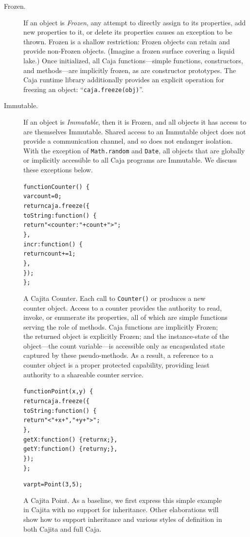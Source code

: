 \documentclass[letterpaper,twocolumn,10pt]{article}
\newcommand{\code}[1]{{\tt {#1}}}              %
\begin{document}
\begin{description}
  \item[Frozen.] If an object is \emph{Frozen}, any attempt to directly 
  assign to its properties, add new properties to it, or delete its 
  properties causes an exception to be thrown. Frozen is a shallow 
  restriction: Frozen objects can retain and provide non-Frozen objects. 
  (Imagine a frozen surface covering a liquid lake.) Once initialized, all 
  Caja functions---simple functions, constructors, and methods---are 
  implicitly frozen, as are constructor prototypes. The Caja runtime library 
  additionally provides an explicit operation for freezing an object: 
  ``\code{caja.freeze(obj)}''.
  
  \item[Immutable.] If an object is \emph{Immutable}, then it is Frozen, and 
  all objects it has access to are themselves Immutable. Shared access to an 
  Immutable object does not provide a communication channel, and so does not 
  endanger isolation. With the exception of \code{Math.random} and 
  \code{Date}, all objects that are globally or implicitly accessible to all 
  Caja programs are Immutable. We discuss these exceptions below.  

\end{description}

\begin{figure}
\begin{alltt}
function Counter()\ \{
  var count = 0;
  return caja.freeze(\{
    toString: function()\ \{ 
      return "<counter: " + count + ">"; 
    \},
    incr: function()\ \{ 
      return count += 1; 
    \},
  \});
\};
\end{alltt}

\caption[A Cajita Counter.]{A Cajita Counter. Each call to \code{Counter()} 
or produces a new counter object. Access to a counter provides the authority 
to read, invoke, or enumerate its properties, all of which are simple 
functions serving the role of methods. Caja functions are implicitly Frozen; 
the returned object is explicitly Frozen; and the instance-state of the 
object---the count variable---is accessible only as encapsulated state 
captured by these pseudo-methods. As a result, a reference to a counter 
object is a proper protected capability, providing least authority to a 
shareable counter service.}
\label{fig:cajita-counter}
\end{figure}

\begin{figure}
\begin{alltt}
function Point(x, y)\ \{
  return caja.freeze(\{
    toString: function()\ \{ 
      return "<" + x + "," + y + ">"; 
    \},
    getX: function()\ \{ return x; \},
    getY: function()\ \{ return y; \},
  \});
\};

var pt = Point(3, 5);
\end{alltt}

\caption[A Cajita Point.]{A Cajita Point. As a baseline, we first express 
this simple example in Cajita with no support for inheritance. Other 
elaborations will show how to support inheritance and various styles of 
definition in both Cajita and full Caja.}
\label{fig:cajita-point}
\end{figure}
\end{document}

